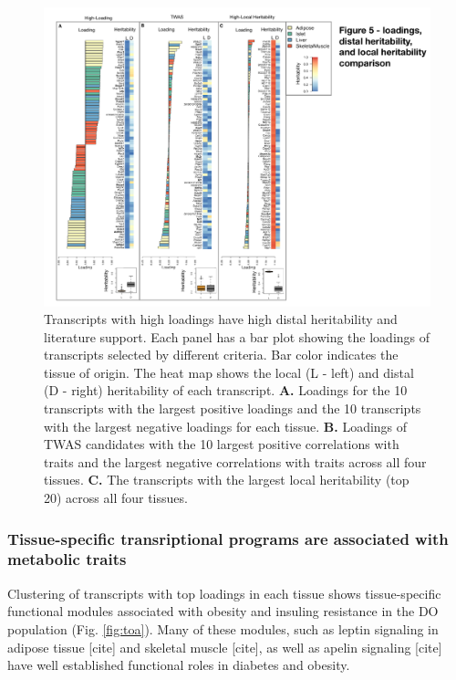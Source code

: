 \documentclass[
]{article}
\begin{document}
\begin{figure}[ht!]
\includegraphics[width=\textwidth]{Figures/Fig5_loading_heritability.pdf} 
\caption{Transcripts with high loadings have high distal heritability
and literature support. Each panel has a bar plot showing the loadings 
of transcripts selected by different criteria. Bar color indicates the 
tissue of origin. The heat map shows the local (L - left) and distal 
(D - right) heritability of each transcript. \textbf{A.} Loadings for 
the 10 transcripts with the largest positive loadings and the 10 
transcripts with the largest negative loadings for each tissue. 
\textbf{B.} Loadings of TWAS candidates with the 10 largest positive 
correlations with traits and the largest negative correlations with 
traits across all four tissues. \textbf{C.} The transcripts with the 
largest local heritability (top 20) across all four tissues.
}
\label{fig:loading_heritability}
\end{figure}

\subsubsection{Tissue-specific transriptional programs are associated
with metabolic
traits}\label{tissue-specific-transriptional-programs-are-associated-with-metabolic-traits}

Clustering of transcripts with top loadings in each tissue shows
tissue-specific functional modules associated with obesity and insuling
resistance in the DO population (Fig. \ref{fig:toa}). Many of these
modules, such as leptin signaling in adipose tissue {[}cite{]} and
skeletal muscle {[}cite{]}, as well as apelin signaling {[}cite{]} have
well established functional roles in diabetes and obesity.
\end{document}
